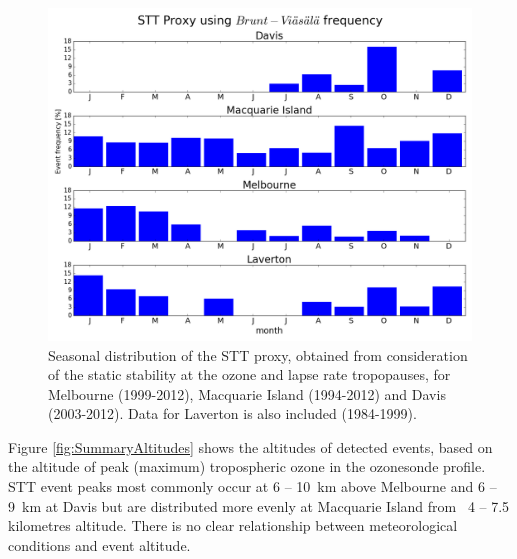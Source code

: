 \documentclass{article}
\begin{document}
  \begin{figure}[!htbp]
    \begin{center}
    \includegraphics[width=0.8\columnwidth]{figures/AndrewSTTProxy_py.png}
    \caption{Seasonal distribution of the STT proxy, obtained from consideration of the static stability at the ozone and lapse rate tropopauses, for Melbourne (1999-2012), Macquarie Island (1994-2012) and Davis (2003-2012).
    Data for Laverton is also included (1984-1999).}
    \label{fig:AndrewProxySTT}
    \end{center}
  \end{figure}
  
  Figure \ref{fig:SummaryAltitudes} shows the altitudes of detected events, based on the altitude of peak (maximum) tropospheric ozone in the ozonesonde profile.
  STT event peaks most commonly occur at 6 -- 10~km above Melbourne and 6 -- 9~km at Davis but are distributed more evenly at Macquarie Island from ~4 -- 7.5 kilometres altitude.
  There is no clear relationship between meteorological conditions and event altitude.
  
\end{document}
